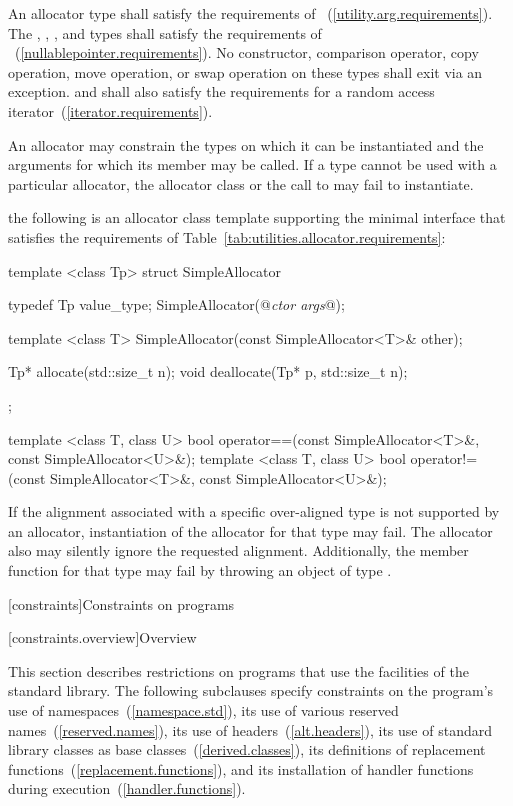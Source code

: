 \pnum
An allocator type  shall satisfy the requirements of
~(\ref{utility.arg.requirements}).
The , , , and
 types shall satisfy the requirements of
~(\ref{nullablepointer.requirements}).
No constructor,
comparison operator, copy operation, move operation, or swap operation on
these types shall exit via an exception.  and  shall also
satisfy the requirements for a random access
iterator~(\ref{iterator.requirements}).

\pnum
An allocator may constrain the types on which it can be instantiated and the
arguments for which its  member may be called. If a type
cannot be used with a particular allocator, the allocator class or the call to
 may fail to instantiate.

\enterexample the following is an allocator class template supporting the minimal
interface that satisfies the requirements of
Table~\ref{tab:utilities.allocator.requirements}:

\begin{codeblock}
template <class Tp>
struct SimpleAllocator {
  typedef Tp value_type;
  SimpleAllocator(@\textit{ctor args}@);

  template <class T> SimpleAllocator(const SimpleAllocator<T>& other);

  Tp* allocate(std::size_t n);
  void deallocate(Tp* p, std::size_t n);
};

template <class T, class U>
bool operator==(const SimpleAllocator<T>&, const SimpleAllocator<U>&);
template <class T, class U>
bool operator!=(const SimpleAllocator<T>&, const SimpleAllocator<U>&);
\end{codeblock}
\exitexample

\pnum
If the alignment associated with a specific over-aligned type is not
supported by an allocator, instantiation of the allocator for that type may
fail. The allocator also may silently ignore the requested alignment.
\enternote Additionally, the member function 
for that type may fail by throwing an object of type
.\exitnote

[constraints]{Constraints on programs}

[constraints.overview]{Overview}

\pnum
This section describes restrictions on \Cpp programs that use the facilities of
the \Cpp standard library. The following subclauses specify constraints on the
program's use of namespaces~(\ref{namespace.std}), its use of various reserved
names~(\ref{reserved.names}), its use of headers~(\ref{alt.headers}), its use of
standard library classes as base classes~(\ref{derived.classes}), its
definitions of replacement functions~(\ref{replacement.functions}), and its
installation of handler functions during execution~(\ref{handler.functions}).


